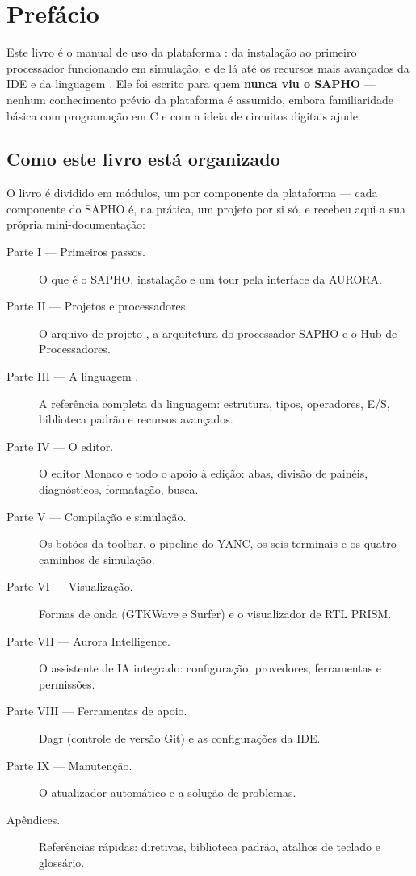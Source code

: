 \chapter{Prefácio}
\label{cap:prefacio}

Este livro é o manual de uso da plataforma : da instalação ao primeiro processador funcionando em simulação, e de lá até os recursos mais avançados da IDE  e da linguagem \cmm{}. Ele foi escrito para quem \textbf{nunca viu o SAPHO} --- nenhum conhecimento prévio da plataforma é assumido, embora familiaridade básica com programação em C e com a ideia de circuitos digitais ajude.

\section*{Como este livro está organizado}

O livro é dividido em módulos, um por componente da plataforma --- cada componente do SAPHO é, na prática, um projeto por si só, e recebeu aqui a sua própria mini-documentação:

\begin{description}
  \item[Parte I --- Primeiros passos.] O que é o SAPHO, instalação e um tour pela interface da AURORA.
  \item[Parte II --- Projetos e processadores.] O arquivo de projeto , a arquitetura do processador SAPHO e o Hub de Processadores.
  \item[Parte III --- A linguagem \cmm{}.] A referência completa da linguagem: estrutura, tipos, operadores, E/S, biblioteca padrão e recursos avançados.
  \item[Parte IV --- O editor.] O editor Monaco e todo o apoio à edição: abas, divisão de painéis, diagnósticos, formatação, busca.
  \item[Parte V --- Compilação e simulação.] Os botões da toolbar, o pipeline do YANC, os seis terminais e os quatro caminhos de simulação.
  \item[Parte VI --- Visualização.] Formas de onda (GTKWave e Surfer) e o visualizador de RTL PRISM.
  \item[Parte VII --- Aurora Intelligence.] O assistente de IA integrado: configuração, provedores, ferramentas e permissões.
  \item[Parte VIII --- Ferramentas de apoio.] Dagr (controle de versão Git) e as configurações da IDE.
  \item[Parte IX --- Manutenção.] O atualizador automático e a solução de problemas.
  \item[Apêndices.] Referências rápidas: diretivas, biblioteca padrão, atalhos de teclado e glossário.
\end{description}

